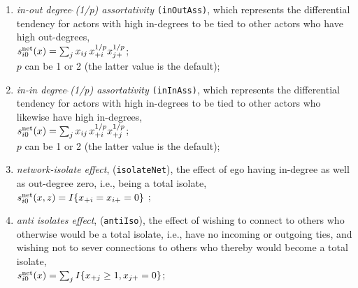 \documentclass[a4paper,fleqn,11pt]{article}
\newcommand{\+}{\, + \,}
\newcommand{\rs}{{\sf RSiena}}
\newcommand{\RS}{{\sf \textsf{RSiena} }}
\newcommand{\vit}{\theenumi}
\newcounter{savenumi}
\begin{document}
\begin{enumerate}
 \item {\em in-out degree$\,\hat{\ }$(1/p) assortativity}
 \texttt{(inOutAss)},
 which represents the differential tendency for actors with high in-degrees
 to be tied to other actors who have high out-degrees,\\
 $s^{\rm net}_{i\vit}(x) = \sum_j x_{ij}\, {x_{+i}^{1/p}} {x_{j+}^{1/p}} $;\\
 $p$ can be 1 or 2 (the latter value is the default);

 \item {\em in-in degree$\,\hat{\ }$(1/p) assortativity}
 \texttt{(inInAss)},
 which represents the differential tendency for actors with high in-degrees
 to be tied to other actors who likewise have high in-degrees,\\
 $s^{\rm net}_{i\vit}(x) = \sum_j x_{ij}\, {x_{+i}^{1/p}} {x_{+j}^{1/p}} $;\\
 $p$ can be 1 or 2 (the latter value is the default);

\item \emph{network-isolate effect}, (\texttt{isolateNet}), the effect of ego having
      in-degree as well as out-degree zero, i.e., being a total isolate,\\
 $s^{\rm net}_{i\vit}(x, z) =   I\{x_{+i} = x_{i+} = 0 \}  $ ;

\item \emph{anti isolates effect}, (\texttt{antiIso}), the effect of
      wishing to connect to others who otherwise would
      be a total isolate, i.e., have no incoming or outgoing
      ties, and wishing not to sever connections to
      others who thereby would become a total isolate,\\
$s^{\rm net}_{i\vit}(x) = \sum_j I\{x_{+j} \geq 1, x_{j+} = 0\} $;\\


\end{enumerate}
\end{document}
